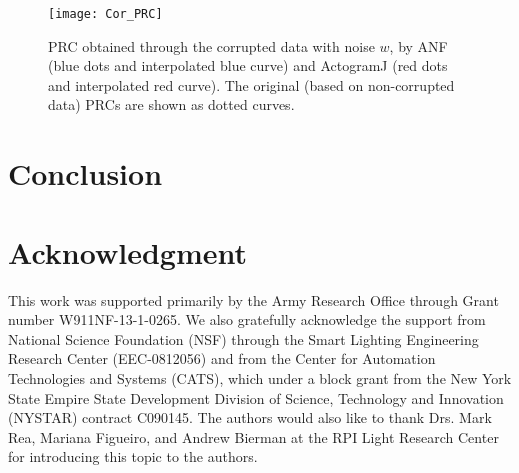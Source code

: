 \documentclass[11pt, onecolumn]{IEEEtran}
\begin{document}
\begin{figure}[ht]
\bc
  \texttt{[image: Cor\_PRC]}
\ec
  \caption{PRC obtained through the corrupted data with noise $w$, by ANF (blue dots and interpolated blue curve) and ActogramJ (red dots and interpolated red curve). The original (based on non-corrupted data) PRCs are shown as dotted curves.\label{Cor_PRC:fig}}
\end{figure}



\section{Conclusion}\label{Conc:Sec}



\section*{Acknowledgment}
This work was supported primarily by the Army Research Office through Grant number W911NF-13-1-0265. We also gratefully acknowledge the support from National Science Foundation (NSF) through the Smart Lighting Engineering Research Center (EEC-0812056) and from the Center for Automation Technologies and Systems (CATS), which  under a block grant from the New York State Empire State Development Division of Science, Technology and Innovation (NYSTAR) contract C090145. The authors would also like to thank Drs. Mark Rea, Mariana Figueiro, and Andrew Bierman at the RPI Light Research Center for introducing this topic to the authors.



\end{document}
